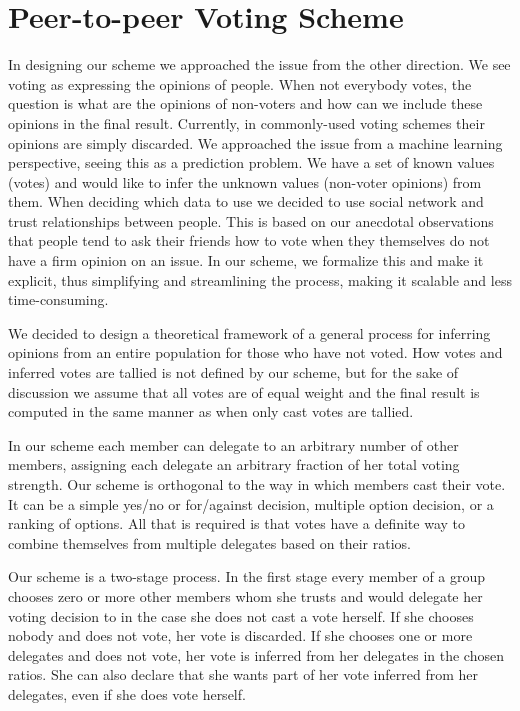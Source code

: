 \documentclass[a4paper]{acm_proc_article-sp}
\begin{document}
\section{Peer-to-peer Voting Scheme}

In designing our scheme we approached the issue from the other direction. We see voting as expressing the opinions of
people. When not everybody votes, the question is what are the opinions of non-voters and how can we include
these opinions in the final result. Currently, in commonly-used voting schemes their opinions are simply discarded.
We approached the issue from a machine learning perspective, seeing this as a prediction problem. We have a set
of known values (votes) and would like to infer the unknown values (non-voter opinions) from them. When deciding which data to
use we decided to use social network and trust relationships between people.  This is based on our anecdotal observations that
people tend to ask their friends how to vote when they themselves do not have a firm opinion on an issue. In our scheme,
we formalize this and make it explicit, thus simplifying and streamlining the process, making it scalable and
less time-consuming.

We decided to design a theoretical framework of a general process for inferring opinions from an entire population for
those who have not voted. How votes and inferred votes are tallied is not defined by our scheme, but for the
sake of discussion we assume that all votes are of equal weight and the final result is computed in the same manner as when
only cast votes are tallied.

In our scheme each member can delegate to an arbitrary number of other members, assigning each delegate an arbitrary fraction
of her total voting strength. Our scheme is orthogonal to the way in which members cast their vote. It can be a simple
yes/no or for/against decision, multiple option decision, or a ranking of options. All that is required is that votes have a
definite way to combine themselves from multiple delegates based on their ratios.

Our scheme is a two-stage process. In the first stage every member of a group chooses zero or more other members whom she
trusts and would delegate her voting decision to in the case she does not cast a vote herself. If she chooses nobody and
does not vote, her vote is discarded. If she chooses one or more delegates and does not vote, her vote is inferred from
her delegates in the chosen ratios. She can also declare that she wants part of her vote inferred from her delegates,
even if she does vote herself.
\end{document}
